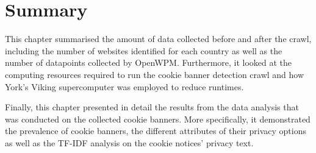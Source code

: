 \documentclass[../main.tex]{subfiles}
\begin{document}
\section{Summary}
This chapter summarised the amount of data collected before and after the crawl, including the number of websites identified for each country as well as the number of datapoints collected by OpenWPM. Furthermore, it looked at the computing resources required to run the cookie banner detection crawl and how York’s Viking supercomputer was employed to reduce runtimes.

Finally, this chapter presented in detail the results from the data analysis that was conducted on the collected cookie banners. More specifically, it demonstrated the prevalence of cookie banners, the different attributes of their privacy options as well as the TF-IDF analysis on the cookie notices’ privacy text.
\end{document}
